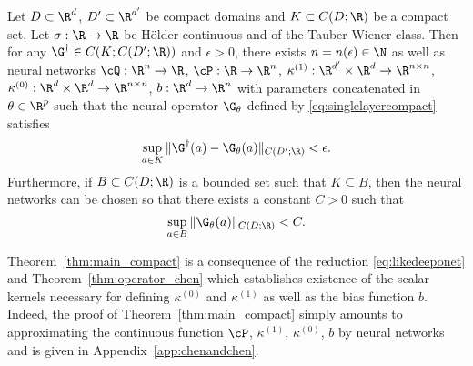 \begin{theorem}
\label{thm:main_compact}
Let \(D \subset \R^d\), \(D' \subset \R^{d'}\) be compact domains and \(K \subset C(D;\R)\) be a compact set. Let \(\sigma : \R \to \R\) be H{\"o}lder continuous and of the Tauber-Wiener class. Then for any \(\G^\dagger \in C(K; C(D';\R))\) and \(\epsilon > 0\), there exists \(n = n(\epsilon) \in \N\) as well as neural networks \(\cQ : \R^n \to \R\), \(\cP: \R \to \R^n\), \(\kappa^{(1)} : \R^{d'} \times \R^d \to \R^{n \times n}\), \(\kappa^{(0)}: \R^d \times \R^d \to \R^{n \times n}\),  \(b : \R^d \to \R^n\) with parameters concatenated in \(\theta \in \R^p\) such that the neural operator \(\G_\theta\) defined by \eqref{eq:singlelayercompact} satisfies
\[\sup_{a \in K} \|\G^\dagger(a) - \G_\theta(a)\|_{C(D';\R)} < \epsilon.\]
Furthermore, if  \(B \subset C(D;\R)\) is a bounded set such that \(K \subseteq B\), then the neural networks can be chosen so that there exists a constant \(C > 0\) such that
\[\sup_{a \in B} \|\G_\theta (a) \|_{C(D;\R)} < C.\]
\end{theorem}

Theorem~\ref{thm:main_compact} is a consequence of the reduction \eqref{eq:likedeeponet} and Theorem~\ref{thm:operator_chen} which establishes existence of the scalar kernels necessary for defining \(\kappa^{(0)}\) and \(\kappa^{(1)}\) as well as the bias function \(b\). Indeed, the proof of Theorem~\ref{thm:main_compact} simply amounts to approximating the continuous function \(\cP\), \(\kappa^{(1)}\), \(\kappa^{(0)}\),  \(b\) by neural networks and is given in Appendix~\ref{app:chenandchen}. 

